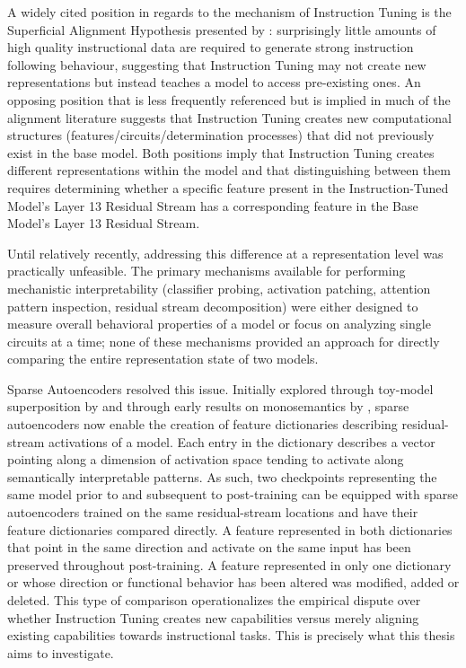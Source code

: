 A widely cited position in regards to the mechanism of Instruction Tuning is the Superficial Alignment Hypothesis presented by \textcite{zhou_lima_2023}: surprisingly little amounts of high quality instructional data are required to generate strong instruction following behaviour, suggesting that Instruction Tuning may not create new representations but instead teaches a model to access pre-existing ones. An opposing position that is less frequently referenced but is implied in much of the alignment literature suggests that Instruction Tuning creates new computational structures (features/circuits/determination processes) that did not previously exist in the base model. Both positions imply that Instruction Tuning creates different representations within the model and that distinguishing between them requires determining whether a specific feature present in the Instruction-Tuned Model's Layer 13 Residual Stream has a corresponding feature in the Base Model's Layer 13 Residual Stream.

Until relatively recently, addressing this difference at a representation level was practically unfeasible. The primary mechanisms available for performing mechanistic interpretability (classifier probing, activation patching, attention pattern inspection, residual stream decomposition) were either designed to measure overall behavioral properties of a model or focus on analyzing single circuits at a time; none of these mechanisms provided an approach for directly comparing the entire representation state of two models.

Sparse Autoencoders \parencite{ng_sparse_2011} resolved this issue. Initially explored through toy-model superposition by \textcite{elhage_toy_2022} and through early results on monosemantics by \textcite{cunningham_sparse_2023}, sparse autoencoders now enable the creation of feature dictionaries describing residual-stream activations of a model. Each entry in the dictionary describes a vector pointing along a dimension of activation space tending to activate along semantically interpretable patterns. As such, two checkpoints representing the same model prior to and subsequent to post-training can be equipped with sparse autoencoders trained on the same residual-stream locations and have their feature dictionaries compared directly. A feature represented in both dictionaries that point in the same direction and activate on the same input has been preserved throughout post-training. A feature represented in only one dictionary or whose direction or functional behavior has been altered was modified, added or deleted. This type of comparison operationalizes the empirical dispute over whether Instruction Tuning creates new capabilities versus merely aligning existing capabilities towards instructional tasks. This is precisely what this thesis aims to investigate.

